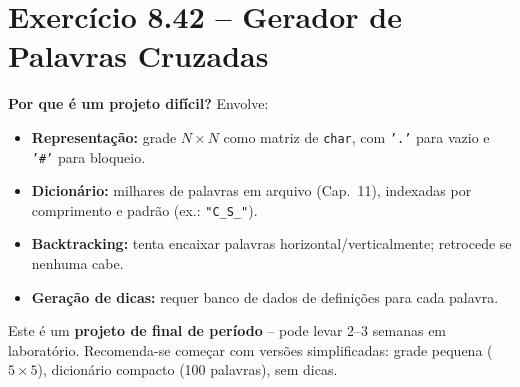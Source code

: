 \documentclass[12pt,a4paper]{article}
\begin{document}
\section{Exercício 8.42 -- Gerador de Palavras Cruzadas}

\begin{respostabox}
\textbf{Por que é um projeto difícil?} Envolve:
\begin{itemize}[noitemsep]
  \item \textbf{Representação:} grade $N \times N$ como matriz de \texttt{char},
  com \texttt{'.'} para vazio e \texttt{'\#'} para bloqueio.
  \item \textbf{Dicionário:} milhares de palavras em arquivo (Cap.~11), indexadas
  por comprimento e padrão (ex.: \texttt{"C\_S\_"}).
  \item \textbf{Backtracking:} tenta encaixar palavras horizontal/verticalmente;
  retrocede se nenhuma cabe.
  \item \textbf{Geração de dicas:} requer banco de dados de definições para
  cada palavra.
\end{itemize}

Este é um \textbf{projeto de final de período} -- pode levar 2--3 semanas em
laboratório. Recomenda-se começar com versões simplificadas: grade pequena
($5 \times 5$), dicionário compacto (100 palavras), sem dicas.
\end{respostabox}
\end{document}
